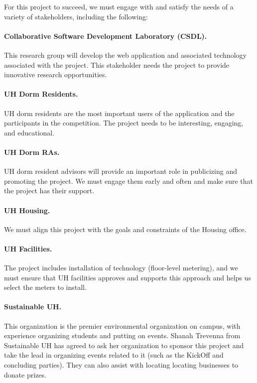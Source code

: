 \documentclass[11pt]{article}
\begin{document}
For this project to succeed, we must engage with and satisfy the needs of a variety of stakeholders, including the following:

\paragraph{Collaborative Software Development Laboratory (CSDL).}   This research group will develop the web application and
associated technology associated with the project.  This stakeholder needs the project to provide innovative research opportunities. 

\paragraph{UH Dorm Residents.}  UH dorm residents are the most important
users of the application and the participants in the competition.  The
project needs to be interesting, engaging, and educational.

\paragraph{UH Dorm RAs.}  UH dorm resident advisors will provide an
important role in publicizing and promoting the project. We must engage
them early and often and make sure that the project  has their support. 

\paragraph{UH Housing.}  We must align this project with the goals and constraints of the Housing office. 

\paragraph{UH Facilities.}  The project includes installation of technology
(floor-level metering), and we must ensure that UH facilities approves and
supports this approach and helps us select the meters to install.

\paragraph{Sustainable UH.}  This organization is the premier environmental
organization on campus, with experience organizing students and putting on
events.  Shanah Trevenna from Sustainable UH has agreed to ask her
organization to sponsor this project and take the lead in organizing events
related to it (such as the KickOff and concluding parties).  They can also
assist with locating locating businesses to donate prizes.
\end{document}
